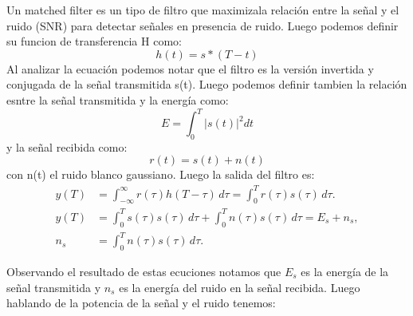 \documentclass[
  11pt,
  letterpaper,
  answers
]{exam}
\begin{document}
\vspace{0.5cm}
\noindent
\vspace{.85cm}
\begin{questions}
\begin{solution}
  Un matched filter es un tipo de filtro que maximizala relación entre la señal y el ruido (SNR) para detectar señales en presencia de ruido. Luego podemos definir su funcion de transferencia H como:
  \begin{equation}
  h(t) = s*(T-t)
  \end{equation}
  Al analizar la ecuación podemos notar que el filtro es la versión invertida y conjugada de la señal transmitida s(t).
  Luego podemos definir tambien la relación esntre la señal transmitida y la energía como:
  \begin{equation}
  E = \int_{0}^{T} |s(t)|^2 dt
  \end{equation}
  y la señal recibida como:
  \begin{equation}
  r(t) = s(t) + n(t)
  \end{equation}
  con n(t) el ruido blanco gaussiano.
  Luego la salida del filtro es:
  \begin{align}
    y(T) &= \int_{-\infty}^{\infty} r(\tau) h(T - \tau) \, d\tau = \int_0^T r(\tau) s(\tau) \, d\tau. \\
    y(T) &= \int_0^T s(\tau) s(\tau) \, d\tau + \int_0^T n(\tau) s(\tau) \, d\tau = E_s + n_s, \\
    n_s &= \int_0^T n(\tau) s(\tau) \, d\tau.
    \end{align}

  Observando el resultado de estas ecuciones notamos que $E_s$ es la energía de la señal transmitida y $n_s$ es la energía del ruido en la señal recibida. Luego hablando de la potencia de la señal y el ruido tenemos:


\end{solution}
\end{questions}
\end{document}
